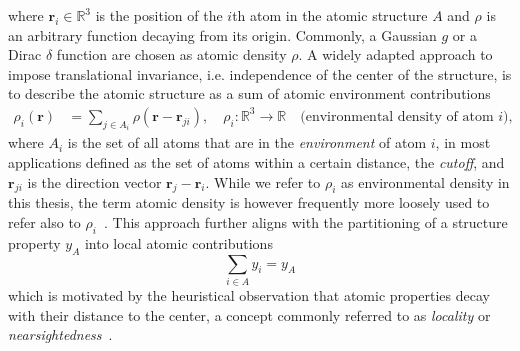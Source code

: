 where $\mathbf{r}_i\in\mathbb{R}^3$ is the position of the $i$th atom in the atomic structure $A$ and $\rho$ is an arbitrary function decaying from its origin. 
Commonly, a Gaussian $g$ or a Dirac $\delta$ function are chosen as atomic density $\rho$.
A widely adapted approach to impose translational invariance, i.e. independence of the center of the structure, is to describe the atomic structure as a sum of atomic environment contributions
\begin{subequations}
\begin{align}
  \label{eq:density_atomic_contributions}
  \rho_i(\mathbf{r}) &= \sum_{j\in A_i} \rho(\mathbf{r}-\mathbf{r}_{ji}),\quad \rho_i:\mathbb{R}^3\rightarrow\mathbb{R}\quad\text{(environmental density of atom $i$)},
\end{align}
\end{subequations}
where $A_i$ is the set of all atoms that are in the \emph{environment} of atom
$i$, in most applications defined as the set of atoms within a certain distance, the
\emph{cutoff}, and $\mathbf{r}_{ji}$ is the direction vector $\mathbf{r}_j-\mathbf{r}_i$. 
While we refer to $\rho_i$ as environmental density in this thesis, the term atomic density is however frequently more loosely used to refer also to $\rho_i$~\cite{musil2021physics}.
This approach further aligns with the partitioning of a structure property $y_A$ into local atomic contributions
\begin{equation}
  \label{eq:structural_separation}
  \sum_{i\in A} y_i = y_A
\end{equation}
which is motivated by the heuristical observation that atomic properties decay with their distance to the center, a concept commonly referred to as \emph{locality} or \emph{nearsightedness}~\cite{prodan2005nearsightedness}.
